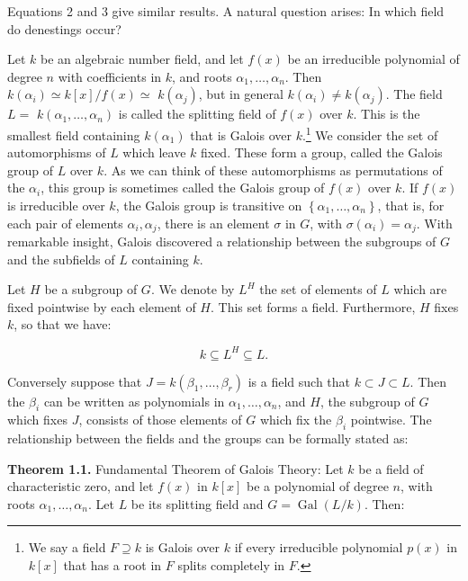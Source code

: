 \documentclass[11pt,letterpaper]{article}
\DeclareMathOperator{\Gal}{Gal}
\begin{document}
Equations 2 and 3 give similar results. A natural question arises: In which field do denestings occur?

Let $k$ be an algebraic number field, and let $f(x)$ be an irreducible polynomial of degree $n$ with coefficients in $k$, and roots $\alpha_{1}, \ldots, \alpha_{n}$. Then $k\left(\alpha_{i}\right) \simeq k[x] / f(x) \simeq$ $k\left(\alpha_{j}\right)$, but in general $k\left(\alpha_{i}\right) \neq k\left(\alpha_{j}\right)$. The field $L=$ $k\left(\alpha_{1}, \ldots, \alpha_{n}\right)$ is called the splitting field of $f(x)$ over $k$. This is the smallest field containing $k\left(\alpha_{1}\right)$ that is Galois over $k$.\footnote{We say a field $F \supseteq k$ is Galois over $k$ if every irreducible polynomial $p(x)$ in $k[x]$ that has a root in $F$ splits completely in $F$.} We consider the set of automorphisms of $L$ which leave $k$ fixed. These form a group, called the Galois group of $L$ over $k$. As we can think of these automorphisms as permutations of the $\alpha_{i}$, this group is sometimes called the Galois group of $f(x)$ over $k$. If $f(x)$ is irreducible over $k$, the Galois group is transitive on $\left\{\alpha_{1}, \ldots, \alpha_{n}\right\}$, that is, for each pair of elements $\alpha_{i}, \alpha_{j}$, there is an element $\sigma$ in $G$, with $\sigma\left(\alpha_{i}\right)=\alpha_{j}$. With remarkable insight, Galois discovered a relationship between the subgroups of $G$ and the subfields of $L$ containing $k$.

Let $H$ be a subgroup of $G$. We denote by $L^{H}$ the set of elements of $L$ which are fixed pointwise by each element of $H$. This set forms a field. Furthermore, $H$ fixes $k$, so that we have:

\[
k \subseteq L^{H} \subseteq L .
\]

Conversely suppose that $J=k\left(\beta_{1}, \ldots, \beta_{r}\right)$ is a field such that $k \subset J \subset L$. Then the $\beta_{i}$ can be written as polynomials in $\alpha_{1}, \ldots, \alpha_{n}$, and $H$, the subgroup of $G$ which fixes $J$, consists of those elements of $G$ which fix the $\beta_{i}$ pointwise. The relationship between the fields and the groups can be formally stated as:

\noindent\textbf{Theorem 1.1.} Fundamental Theorem of Galois Theory: Let $k$ be a field of characteristic zero, and let $f(x)$ in $k[x]$ be a polynomial of degree $n$, with roots $\alpha_{1}, \ldots, \alpha_{n}$. Let $L$ be its splitting field and $G=\Gal(L/k)$. Then:
\end{document}
